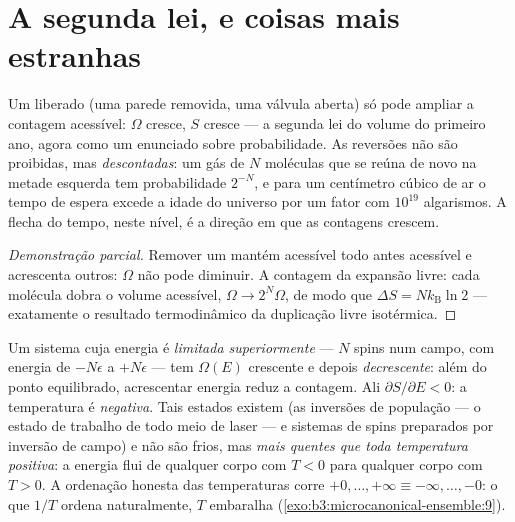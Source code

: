\section{A segunda lei, e coisas mais estranhas}

\begin{proposition}\label{prop:b3:microcanonical-ensemble:second-law}
Um  liberado (uma parede removida, uma válvula aberta) só pode
ampliar a contagem acessível: $\Omega$ cresce, $S$ cresce --- a segunda
lei do volume do primeiro ano, agora como um enunciado sobre
probabilidade. As reversões não são proibidas, mas \emph{descontadas}:
um gás de $N$ moléculas que se reúna de novo na metade esquerda tem
probabilidade $2^{-N}$, e para um centímetro cúbico de ar o tempo de
espera excede a idade do universo por um fator com $10^{19}$
algarismos. A flecha do tempo, neste nível, é a direção em que as
contagens crescem.
\end{proposition}

\begin{proof}[Demonstração parcial]
Remover um  mantém acessível todo  antes acessível e
acrescenta outros: $\Omega$ não pode diminuir. A contagem da expansão
livre: cada molécula dobra o volume acessível, $\Omega \to 2^N\Omega$,
de modo que $\Delta S = Nk_{\text{B}}\ln2$ --- exatamente o resultado
termodinâmico da duplicação livre isotérmica.
\end{proof}

\begin{example}\label{ex:b3:microcanonical-ensemble:negative}
Um sistema cuja energia é \emph{limitada superiormente} --- $N$ spins
num campo, com energia de $-N\epsilon$ a $+N\epsilon$ --- tem
$\Omega(E)$ crescente e depois \emph{decrescente}: além do ponto
equilibrado, acrescentar energia reduz a contagem. Ali
$\partial S/\partial E < 0$: a temperatura é \emph{negativa}. Tais
estados existem (as inversões de população --- o estado de trabalho de
todo meio de laser --- e sistemas de spins preparados por inversão de
campo) e não são frios, mas \emph{mais quentes que toda temperatura
positiva}: a energia flui de qualquer corpo com $T < 0$ para qualquer
corpo com $T > 0$. A ordenação honesta das temperaturas corre
$+0, \dots, +\infty \equiv -\infty, \dots, -0$: o que $1/T$ ordena
naturalmente, $T$ embaralha
(\cref{exo:b3:microcanonical-ensemble:9}).
\end{example}

